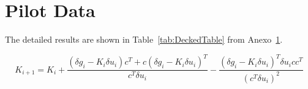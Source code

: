 \section{Pilot Data}
\label{app:surveydata}

The detailed results are shown in Table~\ref{tab:DeckedTable} from Anexo~\ref{app:surveydata}.

\lipsum[23]



\begin{equation}\label{equation126}
  K_{i+1}=K_{i}+\frac{\left ( \delta g_{i}-K_{i}\delta u_{i} \right )c^{T}+c\left ( \delta g_{i}-K_{i}\delta u_{i} \right )^{T}}{c^{T}\delta u_i}-\frac{\left ( \delta g_{i}-K_{i}\delta u_{i} \right )^{T}\delta u_{i} c c^{T}}{\left ( c^{T}\delta u_{i} \right )^{2}}
\end{equation}

\lipsum[23]